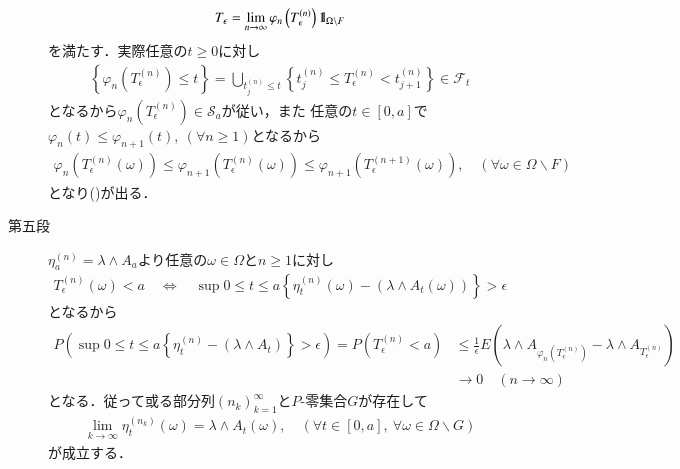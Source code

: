 \begin{prf}
\begin{description}
				\begin{align}
					T_\epsilon = \lim_{n \to \infty} \varphi_n\left(T^{(n)}_\epsilon\right) \mbox{1}\hspace{-0.25em}\mbox{l}_{\Omega \backslash F}
				\end{align}
				を満たす．実際任意の$t \geq 0$に対し
				\begin{align}
					\left\{\varphi_n\left(T^{(n)}_\epsilon\right) \leq t\right\}
					= \bigcup_{t^{(n)}_j \leq t} \left\{t^{(n)}_j \leq T^{(n)}_\epsilon < t^{(n)}_{j+1}\right\}
					\in \mathscr{F}_t
				\end{align}
				となるから$\varphi_n\left(T^{(n)}_\epsilon\right) \in \mathscr{S}_a$が従い，また
				任意の$t \in [0,a]$で$\varphi_n(t) \leq \varphi_{n+1}(t),\ (\forall n \geq 1)$となるから
				\begin{align}
					\varphi_n \left(T^{(n)}_\epsilon(\omega)\right)
					\leq \varphi_{n+1} \left(T^{(n)}_\epsilon(\omega)\right)
					\leq \varphi_{n+1} \left(T^{(n+1)}_\epsilon(\omega)\right),
					\quad (\forall \omega \in \Omega \backslash F)
				\end{align}
				となり()が出る．
			
			\item[第五段]
				$\eta^{(n)}_a = \lambda \wedge A_a$より任意の$\omega \in \Omega$と$n \geq 1$に対し
				\begin{align}
					T^{(n)}_\epsilon(\omega) < a
					\quad \Longleftrightarrow \quad
					\sup{0 \leq t \leq a}{\left\{\eta^{(n)}_t(\omega) - (\lambda \wedge A_t(\omega))\right\}} > \epsilon
				\end{align}
				となるから
				\begin{align}
					P\left(\sup{0 \leq t \leq a}{\left\{\eta^{(n)}_t-(\lambda \wedge A_t)\right\}} > \epsilon\right)
					= P\left(T^{(n)}_\epsilon < a\right)
					&\leq \frac{1}{\epsilon} E\left(\lambda \wedge A_{\varphi_n\left(T^{(n)}_\epsilon\right)}
						- \lambda \wedge A_{T^{(n)}_\epsilon} \right) \\
					&\longrightarrow 0 \quad (n \longrightarrow \infty)
				\end{align}
				となる．従って或る部分列$(n_k)_{k=1}^\infty$と$P$-零集合$G$が存在して
				\begin{align}
					\lim_{k \to \infty} \eta^{(n_k)}_t(\omega) = \lambda \wedge A_t(\omega),
					\quad (\forall t \in [0,a],\ \forall \omega \in \Omega \backslash G)
				\end{align}
				が成立する．
				

\end{description}
\end{prf}

